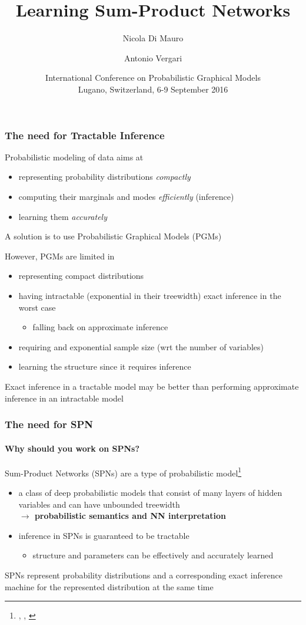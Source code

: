 \documentclass[10pt, t, xcolor={usenames,dvipsnames,svgnames}, compress]{beamer}
\title{Learning Sum-Product Networks}
\author{\small Nicola Di Mauro \and Antonio Vergari}
\date{\scriptsize International Conference on Probabilistic Graphical Models\\
 Lugano, Switzerland, 6-9 September 2016}
\institute{\scriptsize Università degli Studi di Bari}
\newcommand{\customcite}[1]{\footnote{\scriptsize \citeauthor{#1}, \citetitle{#1}, \citeyear{#1}}}
\begin{document}
\begin{frame}[c]
  \titlepage
\end{frame}

\begin{frame}
\frametitle{The need for Tractable Inference}

Probabilistic modeling of data aims at
\begin{itemize}
  \item representing probability distributions \emph{compactly}
  \item computing their marginals and modes \emph{efficiently} (inference)
  \item learning them \emph{accurately}
\end{itemize}
A solution is to use Probabilistic Graphical Models (PGMs)

However, PGMs are limited in
\begin{itemize}
\item representing compact distributions
\item having intractable (exponential in their treewidth) exact inference in the worst case 
  \begin{itemize}
  \item falling back on approximate inference
  \end{itemize}
\item requiring and exponential sample size (wrt the number of variables)
\item learning the structure since it requires inference
\end{itemize}
Exact inference in a tractable model may be better than performing approximate
inference in an intractable model
\end{frame}

\begin{frame}
\frametitle{The need for SPN }
  \framesubtitle{Why should you work on SPNs?}

Sum-Product Networks (SPNs) are a type of probabilistic model\customcite{Poon2011}
\begin{itemize}
\item a class of deep probabilistic  models  that  consist  of  many  layers  of
  hidden variables and can have unbounded treewidth\\ 
  \hfill {\color{violet} \textbf{$\rightarrow$ probabilistic semantics and NN interpretation}}
\item inference in SPNs is guaranteed to be tractable
\begin{itemize}
\item structure and parameters can be effectively and accurately learned
\end{itemize}
\end{itemize}
SPNs represent probability distributions and a corresponding exact inference
machine for the represented distribution at the same time 
\end{frame}
\end{document}
